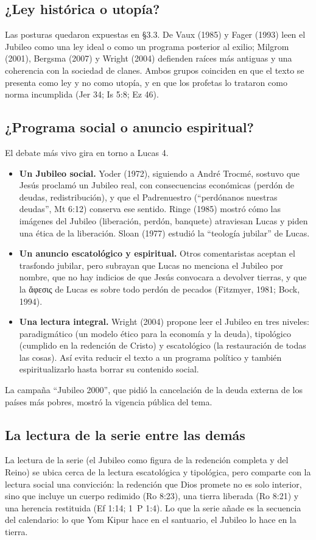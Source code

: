 \documentclass[11pt,letterpaper]{article}
\newcommand{\grc}[1]{\foreignlanguage{ancientgreek}{#1}}
\begin{document}
\subsection{¿Ley histórica o utopía?}
Las posturas quedaron expuestas en §3.3. De Vaux (1985) y Fager (1993) leen el Jubileo como una ley ideal o como un programa posterior al exilio; Milgrom (2001), Bergsma (2007) y Wright (2004) defienden raíces más antiguas y una coherencia con la sociedad de clanes. Ambos grupos coinciden en que el texto se presenta como ley y no como utopía, y en que los profetas lo trataron como norma incumplida (Jer 34; Is 5:8; Ez 46).

\subsection{¿Programa social o anuncio espiritual?}
El debate más vivo gira en torno a Lucas 4.
\begin{itemize}\setlength{\itemsep}{1pt}
\item \textbf{Un Jubileo social.} Yoder (1972), siguiendo a André Trocmé, sostuvo que Jesús proclamó un Jubileo real, con consecuencias económicas (perdón de deudas, redistribución), y que el Padrenuestro (``perdónanos nuestras deudas'', Mt 6:12) conserva ese sentido. Ringe (1985) mostró cómo las imágenes del Jubileo (liberación, perdón, banquete) atraviesan Lucas y piden una ética de la liberación. Sloan (1977) estudió la ``teología jubilar'' de Lucas.
\item \textbf{Un anuncio escatológico y espiritual.} Otros comentaristas aceptan el trasfondo jubilar, pero subrayan que Lucas no menciona el Jubileo por nombre, que no hay indicios de que Jesús convocara a devolver tierras, y que la \grc{ἄφεσις} de Lucas es sobre todo perdón de pecados (Fitzmyer, 1981; Bock, 1994).
\item \textbf{Una lectura integral.} Wright (2004) propone leer el Jubileo en tres niveles: paradigmático (un modelo ético para la economía y la deuda), tipológico (cumplido en la redención de Cristo) y escatológico (la restauración de todas las cosas). Así evita reducir el texto a un programa político y también espiritualizarlo hasta borrar su contenido social.
\end{itemize}
La campaña ``Jubileo 2000'', que pidió la cancelación de la deuda externa de los países más pobres, mostró la vigencia pública del tema.

\subsection{La lectura de la serie entre las demás}
La lectura de la serie (el Jubileo como figura de la redención completa y del Reino) se ubica cerca de la lectura escatológica y tipológica, pero comparte con la lectura social una convicción: la redención que Dios promete no es solo interior, sino que incluye un cuerpo redimido (Ro 8:23), una tierra liberada (Ro 8:21) y una herencia restituida (Ef 1:14; 1~P 1:4). Lo que la serie añade es la secuencia del calendario: lo que Yom Kipur hace en el santuario, el Jubileo lo hace en la tierra.
\end{document}
